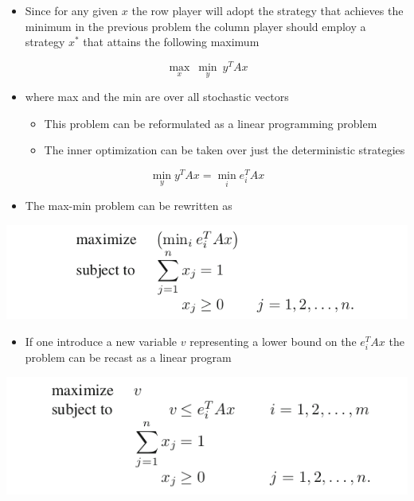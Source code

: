 \documentclass[11pt]{article}
\begin{document}
\begin{itemize}
\item Since for any given \(x\) the row player will adopt the strategy that achieves the minimum in the previous problem the column player should employ a strategy \(x^*\) that attains the following maximum
\end{itemize}
\begin{equation*}
  \max_x \ \min_y \ y^T A x
\end{equation*}
\begin{itemize}
\item where max and the min are over all stochastic vectors 
\begin{itemize}
\item This problem can be reformulated as a linear programming problem
\item The inner optimization can be taken over just the deterministic strategies
\end{itemize}
\end{itemize}
\begin{equation}
  \min_y y^T Ax = \min_i e_i^T Ax
\end{equation}
\begin{itemize}
\item The max-min problem can be rewritten as
\end{itemize}
\begin{center}
\includegraphics[width=.9\linewidth]{Game Theory/screenshot_2019-02-11_15-22-34.png}
\end{center}
\begin{itemize}
\item If one introduce a new variable \(v\) representing a lower bound on the \(e_i^TAx\) the problem can be recast as a linear program
\end{itemize}
\begin{center}
\includegraphics[width=.9\linewidth]{Game Theory/screenshot_2019-02-11_15-25-15.png}
\end{center} 
\end{document}
